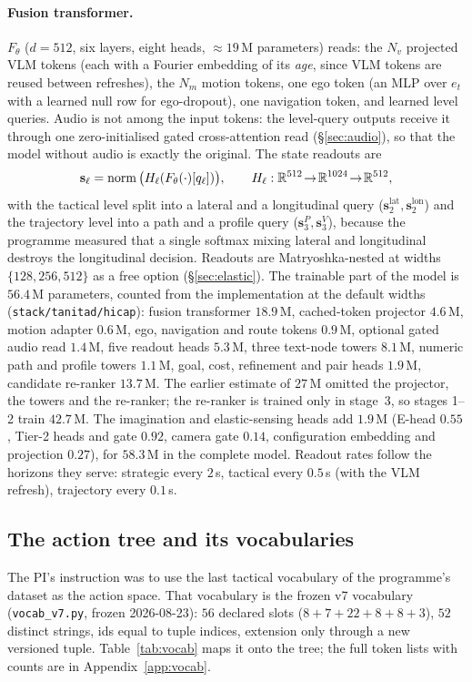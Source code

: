 \paragraph{Fusion transformer.}
$F_\theta$ ($d=512$, six layers, eight heads, $\approx19$\,M parameters\evE) reads: the $N_v$ projected VLM tokens (each with a Fourier embedding of its \emph{age}, since VLM tokens are reused
between refreshes), the $N_m$ motion tokens, one ego token (an MLP over $e_t$ with a learned null row for ego-dropout), one navigation token, and
learned level queries. Audio is not among the input tokens: the level-query outputs receive it through one zero-initialised gated cross-attention read (\S\ref{sec:audio}), so that the model without audio is exactly the original. The state readouts are
\begin{equation}
\mathbf s_\ell=\operatorname{norm}\big(H_\ell(F_\theta(\cdot)[q_\ell])\big),\qquad H_\ell:\mathbb R^{512}\!\to\!\mathbb R^{1024}\!\to\!\mathbb R^{512},
\end{equation}
with the tactical level split into a lateral and a longitudinal query ($\mathbf s_2^{\text{lat}},\mathbf s_2^{\text{lon}}$) and the trajectory level into a path and a profile query ($\mathbf s_3^{P},\mathbf s_3^{V}$), because the programme measured that a single softmax mixing lateral and longitudinal
destroys the longitudinal decision. Readouts are Matryoshka-nested at widths $\{128,256,512\}$ as a free option (\S\ref{sec:elastic}). The trainable part of the model is $56.4$\,M parameters, counted from the implementation at the default widths\evM{} (\texttt{stack/tanitad/hicap}): fusion transformer $18.9$\,M, cached-token projector $4.6$\,M, motion adapter $0.6$\,M, ego, navigation and route tokens $0.9$\,M, optional gated audio read $1.4$\,M, five readout heads $5.3$\,M, three text-node towers $8.1$\,M, numeric path and profile towers $1.1$\,M, goal, cost, refinement and pair heads $1.9$\,M, candidate re-ranker $13.7$\,M. The earlier estimate of $27$\,M omitted the projector, the towers and the re-ranker; the re-ranker is trained only in stage~3, so stages 1--2 train $42.7$\,M. The imagination and elastic-sensing heads add $1.9$\,M (E-head $0.55$, Tier-2 heads and gate $0.92$, camera gate $0.14$, configuration embedding and projection $0.27$), for $58.3$\,M in the complete model\evM.
Readout rates follow the horizons they serve: strategic every $2$\,s, tactical every $0.5$\,s (with the VLM refresh), trajectory every $0.1$\,s.

\subsection{The action tree and its vocabularies}\label{sec:vocab}
The PI's instruction was to use the last tactical vocabulary of the programme's dataset as the action space. That vocabulary is the frozen v7 vocabulary (\texttt{vocab\_v7.py}, frozen 2026-08-23): $56$ declared slots
($8+7+22+8+8+3$), $52$ distinct strings, ids equal to tuple indices, extension only through a new versioned tuple\evI. Table~\ref{tab:vocab} maps it onto the tree; the full token lists with counts are in Appendix~\ref{app:vocab}.

